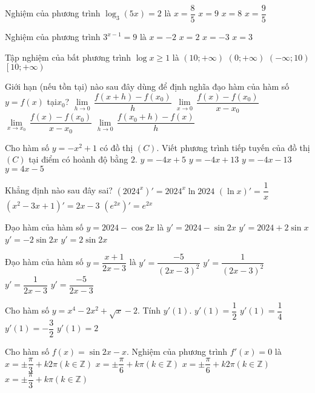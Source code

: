 \begin{ex}
Nghiệm của phương trình $\log _3(5x)=2$ là
\choice
{$x=\dfrac{8}{5}$}
{$x=9$}
{$x=8$}
{$x=\dfrac{9}{5}$}
\end{ex}
\begin{ex}
Nghiệm của phương trình ${3^{x-1}}=9$ là
\choice
{$x=-2$}
{$x=2$}
{$x=-3$}
{$x=3$}
\end{ex}
\begin{ex}
Tập nghiệm của bất phương trình $\log x\ge 1$ là
\choice
{$\left(10;+\infty\right)$}
{$\left(0;+\infty\right)$}
{$\left(-\infty ;10\right)$}
{$\left[10;+\infty\right)$}
\end{ex}
\begin{ex}
Giới hạn (nếu tồn tại) nào sau đây dùng để định nghĩa đạo hàm của hàm số $y=f(x)$ tại$x_0$?
\choice
{$ \lim\limits_{h\to 0} \,\dfrac{f(x+h)-f(x_0)}{h}$}
{$ \lim\limits_{x\to 0} \,\dfrac{f(x)-f(x_0)}{x-x_0}$}
{$ \lim\limits_{x\to x_0} \,\dfrac{f(x)-f(x_0)}{x-x_0}$}
{$ \lim\limits_{h\to 0} \,\dfrac{f(x_0+h)-f(x)}{h}$}
\end{ex}
\begin{ex}
Cho hàm số $y=-x^2+1$ có đồ thị $(C)$. Viết phương trình tiếp tuyến của đồ thị $(C)$ tại điểm có hoành độ bằng $2$.
\choice
{$y=-4x+5$}
{$y=-4x+13$}
{$y=-4x-13$}
{$y=4x-5$}
\end{ex}
\begin{ex}
Khẳng định nào sau đây sai?
\choice
{$(2024^x)'=2024^x \ln 2024$}
{$(\ln x)'=\dfrac{1}{x}$}
{$(x^2-3x+1)'=2x-3$}
{$(e^{2x})'={e^{2x}}$}
\end{ex}
\begin{ex}
Đạo hàm của hàm số $y=2024-\cos 2x$ là
\choice
{$y'=2024-\sin 2x$}
{$y'=2024+2\sin x$}
{$y'=-2\sin 2x$}
{$y'=2\sin 2x$}
\end{ex}
\begin{ex}
Đạo hàm của hàm số $y=\dfrac{x+1}{2x-3}$ là
\choice
{$y'=\dfrac{-5}{(2x-3)^2}$}
{$y'=\dfrac{1}{(2x-3)^2}$}
{$y'=\dfrac{1}{2x-3}$}
{$y'=\dfrac{-5}{2x-3}$}
\end{ex}
\begin{ex}
Cho hàm số $y=x^4-2x^2+\sqrt{x}-2$. Tính $y'(1)$.
\choice
{$y'(1)=\dfrac{1}{2}$}
{$y'(1)=\dfrac{1}{4}$}
{$y'(1)=-\dfrac{3}{2}$}
{$y'(1)=2$}
\end{ex}
\begin{ex}
Cho hàm số $f(x)=\sin 2x-x$. Nghiệm của phương trình $f'(x)=0$ là
\choice
{$x=\pm \dfrac{\pi }{3}+k2\pi (k\in \mathbb{Z})$}
{$x=\pm \dfrac{\pi }{6}+k\pi (k\in \mathbb{Z})$}
{$x=\pm \dfrac{\pi }{6}+k2\pi (k\in \mathbb{Z})$}
{ $x=\pm \dfrac{\pi }{3}+k\pi (k\in \mathbb{Z})$}
\end{ex}
